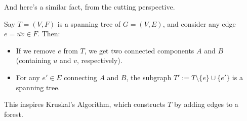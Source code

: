 And here's a similar fact, from the cutting perspective.

\begin{claim}
    Say $T = (V, F)$ is a spanning tree of $G = (V, E)$, and consider any edge $e = \overline{uv} \in F$.  Then:
    \begin{itemize}
        \item If we remove $e$ from $T$, we get two connected components $A$ and $B$ (containing $u$ and $v$, respectively).
        \item For any $e' \in E$ connecting $A$ and $B$, the subgraph $T' := T \setminus \{ e \} \cup \{e'\}$ is a spanning tree.
    \end{itemize}
\end{claim}




    


    

This inspires Kruskal's Algorithm, which constructs $T$ by adding edges to a forest.

